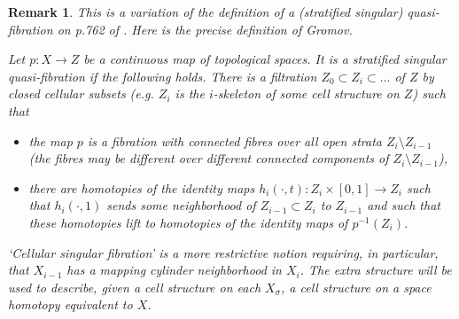 \documentclass[11pt,letterpaper]{amsart}
\newtheorem*{remark}{Remark}
\begin{document}
\begin{remark}
This is a variation of the definition of a (stratified singular) quasi-fibration on p.762 of \cite{gromovexpanders}. Here is the precise definition of Gromov.

Let $p:X\rightarrow Z$ be a continuous map of topological spaces. It is a stratified singular quasi-fibration if the following holds. There is a filtration $Z_0\subset Z_i\subset\dots$ of $Z$ by closed cellular subsets (e.g. $Z_i$ is the $i$-skeleton of some cell structure on $Z$) such that 
\begin{itemize}
\item 
the map $p$ is a fibration with connected fibres over all open strata $Z_i\setminus Z_{i-1}$ (the fibres may be different over different connected components of $Z_i\setminus Z_{i-1}$),
\item 
there are homotopies of the identity maps $h_i(\cdot,t):Z_i\times[0,1]\rightarrow Z_i$ such that $h_i(\cdot,1)$ sends some neighborhood of $Z_{i-1}\subset Z_i$ to $Z_{i-1}$ and such that these homotopies lift to homotopies of the identity maps of $p^{-1}(Z_i)$.  
\end{itemize}
`Cellular singular fibration' is a more restrictive notion requiring, in particular, that $X_{i-1}$ has a mapping cylinder neighborhood in $X_i$. The extra structure will be used to describe, given a cell structure on each $X_{\sigma}$, a cell structure on a space homotopy equivalent to $X$.
\end{remark}
\end{document}
